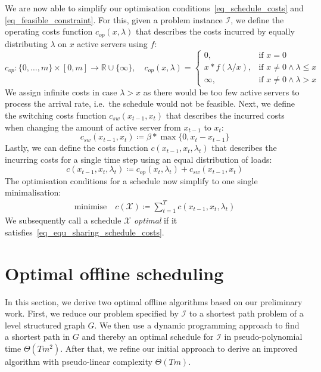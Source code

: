 \documentclass[hidelinks]{article}
\theoremstyle{plain}
\theoremstyle{definition}
\theoremstyle{rem}
\newcommand{\mx}{\mathcal{X}}
\newcommand{\inp}{\mathcal{I}}
\newcommand{\costs}{c}
\newcommand{\opcosts}{c_{op}}
\newcommand{\swcosts}{c_{sw}}
\newcommand{\fromto}[2]{\{#1,\ldots,#2\}}
\begin{document}
We are now able to simplify our optimisation conditions~\eqref{eq_schedule_costs} and \eqref{eq_feasible_constraint}. 
For this, given a problem instance $\inp$, we define the operating costs function $\opcosts(x,\lambda)$ that describes the costs incurred by equally distributing $\lambda$ on $x$ active servers using $f$:
\begin{equation*}
	\opcosts:\fromto{0}{m}\times[0,m]\rightarrow\mathbb{R}\cup\{\infty\},\quad \opcosts(x,\lambda)=\begin{cases}
          0, & \text{if $x=0$}\\
	  x*f(\lambda/x), & \text{if $x\ne 0\land\lambda\le x$}\\
	  \infty, & \text{if $x\ne 0\land\lambda>x$}
	  \end{cases} \label{fct:c}
\end{equation*}
We assign infinite costs in case $\lambda>x$ as there would be too few active servers to process the arrival rate, i.e.\ the schedule would not be feasible. Next, we define the switching costs function $\swcosts(x_{t-1},x_t)$ that describes the incurred costs when changing the amount of active server from $x_{t-1}$ to $x_t$:
\begin{equation*}
	\swcosts(x_{t-1},x_t)\coloneqq\beta*\max\{0,x_t-x_{t-1}\}
\end{equation*}
Lastly, we can define the costs function $\costs(x_{t-1},x_t,\lambda_t)$ that describes the incurring costs for a single time step using an equal distribution of loads:
\begin{equation*}
	\costs(x_{t-1},x_{t},\lambda_t)\coloneqq\opcosts(x_t,\lambda_t)+\swcosts(x_{t-1},x_t)
\end{equation*}
The optimisation conditions for a schedule now simplify to one single minimalisation:
\begin{align}
	\text{minimise}\quad \costs(\mx)\coloneqq\sum\limits_{t=1}^{T}\costs(x_{t-1},x_{t},\lambda_t)\label{eq_equ_sharing_schedule_costs}
\end{align}
We subsequently call a schedule $\mx$ \textit{optimal} if it satisfies~\eqref{eq_equ_sharing_schedule_costs}.

\section{Optimal offline scheduling}
In this section, we derive two optimal offline algorithms based on our preliminary work.
First, we reduce our problem specified by $\inp$ to a shortest path problem of a level structured graph $G$. We then use a dynamic programming approach to find a shortest path in $G$ and thereby an optimal schedule for $\inp$ in pseudo-polynomial time $\Theta(Tm^2)$.
After that, we refine our initial approach to derive an improved algorithm with pseudo-linear complexity $\Theta(Tm)$.
\end{document}
